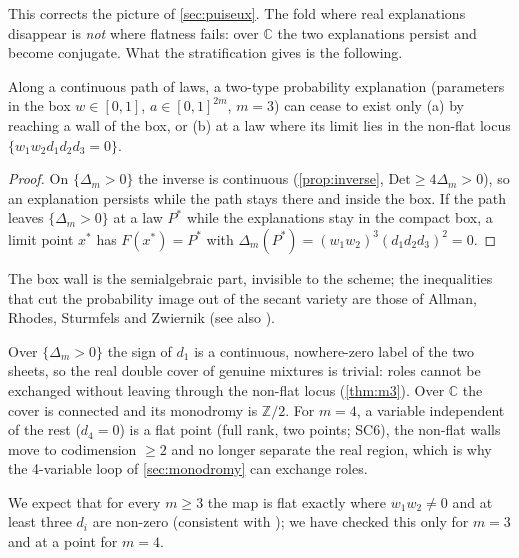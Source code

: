 \documentclass[11pt]{article}
\theoremstyle{definition}\newtheorem{definition}[theorem]{Definition}\newtheorem{remark}[theorem]{Remark}\newtheorem{example}[theorem]{Example}
\begin{document}
This corrects the picture of \cref{sec:puiseux}. The fold where real explanations disappear is \emph{not} where flatness fails: over
$\mathbb C$ the two explanations persist and become conjugate. What the stratification gives is the following.

\begin{corollary}\label{cor:die}
Along a continuous path of laws, a two-type probability explanation (parameters in the box $w\in[0,1]$, $a\in[0,1]^{2m}$, $m=3$) can cease
to exist only (a) by reaching a wall of the box, or (b) at a law where its limit lies in the non-flat locus $\{w_1w_2d_1d_2d_3=0\}$.
\end{corollary}

\begin{proof}
On $\{\Delta_m>0\}$ the inverse is continuous (\cref{prop:inverse}, $\mathrm{Det}\ge4\Delta_m>0$), so an explanation persists while the
path stays there and inside the box. If the path leaves $\{\Delta_m>0\}$ at a law $P^*$ while the explanations stay in the compact box, a
limit point $x^*$ has $F(x^*)=P^*$ with $\Delta_m(P^*)=(w_1w_2)^3(d_1d_2d_3)^2=0$.
\end{proof}

The box wall is the semialgebraic part, invisible to the scheme; the inequalities that cut the probability image out of the secant variety
are those of Allman, Rhodes, Sturmfels and Zwiernik \cite{AllmanRhodesSturmfelsZwiernik2015} (see also \cite{Zwiernik2016}).

\begin{corollary}\label{cor:mono}
Over $\{\Delta_m>0\}$ the sign of $d_1$ is a continuous, nowhere-zero label of the two sheets, so the real double cover of genuine mixtures
is trivial: roles cannot be exchanged without leaving through the non-flat locus (\cref{thm:m3}). Over $\mathbb C$ the cover is connected and
its monodromy is $\mathbb Z/2$. For $m=4$, a variable independent of the rest ($d_4=0$) is a flat point (full rank, two points; SC6), the
non-flat walls move to codimension $\ge2$ and no longer separate the real region, which is why the 4-variable loop of
\cref{sec:monodromy} can exchange roles.
\end{corollary}

We expect that for every $m\ge3$ the map is flat exactly where $w_1w_2\neq0$ and at least three $d_i$ are non-zero (consistent with
\cite{AllmanMatiasRhodes2009}); we have checked this only for $m=3$ and at a point for $m=4$.
\end{document}
